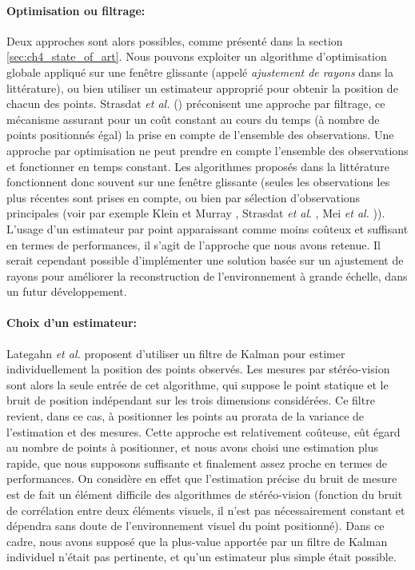 \paragraph{Optimisation ou filtrage:\\}
Deux approches sont alors possibles, comme présenté dans la section \ref{sec:ch4_state_of_art}. Nous pouvons exploiter un algorithme d'optimisation globale appliqué sur une fenêtre glissante (appelé \textit{ajustement de rayons} dans la littérature), ou bien utiliser un estimateur approprié pour obtenir la position de chacun des points. Strasdat \textit{et al.} (\cite{Strasdat2012}) préconisent une approche par filtrage, ce mécanisme assurant pour un coût constant au cours du temps (à nombre de points positionnés égal) la prise en compte de l'ensemble des observations. Une approche par optimisation ne peut prendre en compte l'ensemble des observations et fonctionner en temps constant. Les algorithmes proposés dans la littérature fonctionnent donc souvent sur une fenêtre glissante (seules les observations les plus récentes sont prises en compte, ou bien par sélection d'observations principales (voir par exemple Klein et Murray \cite{Klein2007}, Strasdat \textit{et al}. \cite{Strasdat}, Mei \textit{et al.} \cite{Mei2010})). L'usage d'un estimateur par point apparaissant comme moins coûteux et suffisant en termes de performances, il s'agit de l'approche que nous avons retenue. Il serait cependant possible d'implémenter une solution basée sur un ajustement de rayons pour améliorer la reconstruction de l'environnement à grande échelle, dans un futur développement.

\paragraph{Choix d'un estimateur:\\}
Lategahn \textit{et al.} \cite{Lategahn2011} proposent d'utiliser un filtre de Kalman pour estimer individuellement la position des points observés. Les mesures par stéréo-vision sont alors la seule entrée de cet algorithme, qui suppose le point statique et le bruit de position indépendant sur les trois dimensions considérées. Ce filtre revient, dans ce cas, à positionner les points au prorata de la variance de l'estimation et des mesures. Cette approche est relativement coûteuse, eût égard au nombre de points à positionner, et nous avons choisi une estimation plus rapide, que nous supposons suffisante et finalement assez proche en termes de performances. On considère en effet que l'estimation précise du bruit de mesure est de fait un élément difficile des algorithmes de stéréo-vision (fonction du bruit de corrélation entre deux éléments visuels, il n'est pas nécessairement constant et dépendra sans doute de l'environnement visuel du point positionné). Dans ce cadre, nous avons supposé que la plus-value apportée par un filtre de Kalman individuel n'était pas pertinente, et qu'un estimateur plus simple était possible.

